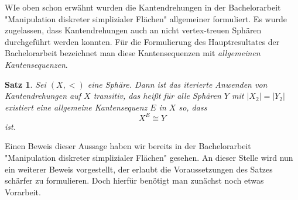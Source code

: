 \documentclass[12pt,titlepage,twoside,cleardoublepage]{article}
\theoremstyle{nummermitklammern}
\newtheorem{satz}[temp]{Satz}
\newtheorem{satz}[zahl]{Satz}
\numberwithin{equation}{section}
\begin{document}
WIe oben schon erwähnt wurden die Kantendrehungen in der Bachelorarbeit "Manipulation diskreter simplizialer Flächen" allgemeiner formuliert. Es wurde zugelassen, dass Kantendrehungen auch an nicht vertex-treuen Sphären durchgeführt werden konnten. Für die Formulierung des Hauptresultates der Bachelorarbeit bezeichnet man diese Kantensequenzen mit \emph{allgemeinen Kantensequenzen}.
\begin{satz}
Sei $(X,<)$ eine Sphäre. Dann ist das iterierte Anwenden von Kantendrehungen auf $X$ transitiv, 
 das heißt für alle Sphären $Y$ mit $\vert X_2\vert=\vert Y_2\vert$ existiert eine allgemeine Kantensequenz $E$ in $X$ so, dass 
\[
X^E \cong Y
\]
ist. 
\end{satz}
Einen Beweis dieser Aussage haben wir bereits in der Bachelorarbeit "Manipulation diskreter simplizialer Flächen"  gesehen. An dieser Stelle wird nun ein weiterer Beweis vorgestellt, der erlaubt die Voraussetzungen des Satzes schärfer zu formulieren. Doch hierfür benötigt man zunächst noch etwas Vorarbeit.
\end{document}

